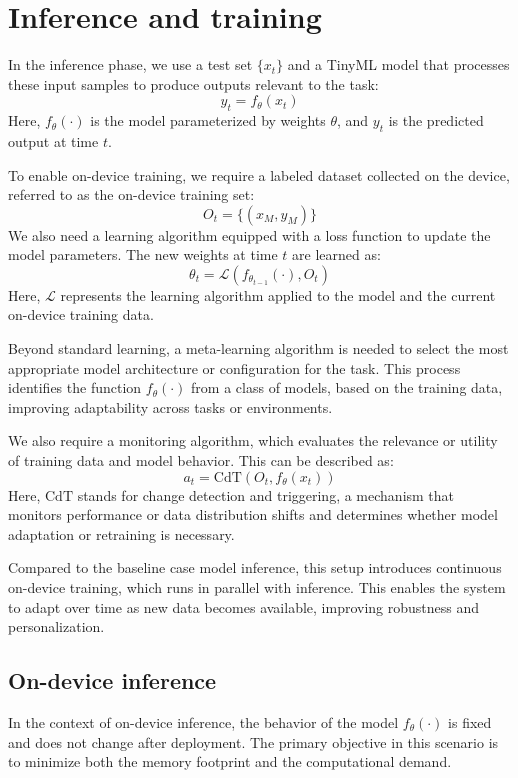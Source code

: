 \section{Inference and training}

In the inference phase, we use a test set $\{x_t\}$ and a TinyML model that processes these input samples to produce outputs relevant to the task:
\[y_t=f_{\theta}(x_t)\]
\noindent Here, $f_{\theta}(\cdot)$ is the model parameterized by weights $\theta$, and $y_t$ is the predicted output at time $t$.

To enable on-device training, we require a labeled dataset collected on the device, referred to as the on-device training set:
\[O_t=\{(x_M,y_M)\}\]
We also need a learning algorithm equipped with a loss function to update the model parameters. 
The new weights at time $t$ are learned as:
\[\theta_t=\mathcal{L}(f_{\theta_{t-1}}(\cdot),O_t)\] 
\noindent Here, $\mathcal{L}$ represents the learning algorithm applied to the model and the current on-device training data.

Beyond standard learning, a meta-learning algorithm is needed to select the most appropriate model architecture or configuration for the task. 
This process identifies the function $f_\theta(\cdot)$ from a class of models, based on the training data, improving adaptability across tasks or environments.

We also require a monitoring algorithm, which evaluates the relevance or utility of training data and model behavior. 
This can be described as:
\[a_t=\text{CdT}(O_t,f_\theta(x_t))\]
\noindent Here, $\text{CdT}$ stands for change detection and triggering, a mechanism that monitors performance or data distribution shifts and determines whether model adaptation or retraining is necessary.

Compared to the baseline case model inference, this setup introduces continuous on-device training, which runs in parallel with inference. 
This enables the system to adapt over time as new data becomes available, improving robustness and personalization.

\subsection{On-device inference}
In the context of on-device inference, the behavior of the model $f_\theta(\cdot)$ is fixed and does not change after deployment. 
The primary objective in this scenario is to minimize both the memory footprint and the computational demand. 

